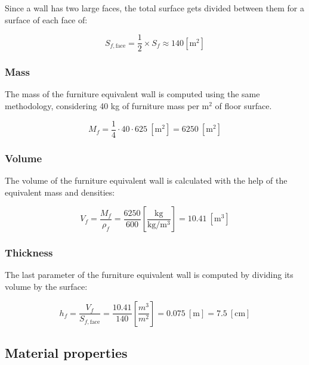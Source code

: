 Since a wall has two large faces, the total surface gets divided between them
for a surface of each face of: 

\begin{equation}
    S_{f, \text{face}} = 
    \frac{1}{2} \times S_f \approx 140 \left[\text{m}^2\right]
\end{equation}

\subsubsection*{Mass}

The mass of the furniture equivalent wall is computed using the same
methodology, considering 40 kg of furniture mass per $\text{m}^2$ of floor
surface.

\begin{equation}
    M_f = \frac{1}{4} \cdot 40 \cdot 625\ \left[\text{m}^2\right] = 6250\
    \left[\text{m}^2\right]
\end{equation}

\subsubsection*{Volume}

The volume of the furniture equivalent wall is calculated with the help of the
equivalent mass and densities:

\begin{equation}
    V_f = \frac{M_f}{\rho_f} = \frac{6250}{600}
    \left[\frac{\text{kg}}{\text{kg}/\text{m}^3}\right]
    = 10.41\ \left[\text{m}^3\right]
\end{equation}

\subsubsection*{Thickness}

The last parameter of the furniture equivalent wall is computed by dividing its
volume by the surface:

\begin{equation}
    h_f = \frac{V_f}{S_{f, \text{face}}} 
    = \frac{10.41}{140} \left[\frac{m^3}{m^2}\right]
    = 0.075\ \left[\text{m}\right] = 7.5\ \left[\text{cm}\right]
\end{equation}


\subsection{Material properties}

